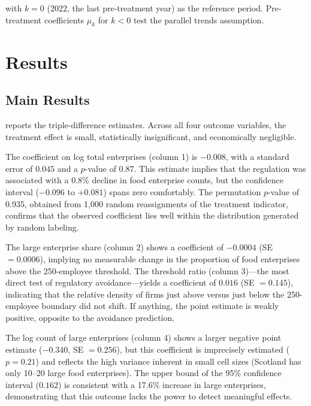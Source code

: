 \documentclass[12pt]{article}
\begin{document}
\noindent with $k = 0$ (2022, the last pre-treatment year) as the reference period. Pre-treatment coefficients $\mu_k$ for $k < 0$ test the parallel trends assumption.


\section{Results}
\label{sec:results}

\subsection{Main Results}

 reports the triple-difference estimates. Across all four outcome variables, the treatment effect is small, statistically insignificant, and economically negligible.



The coefficient on log total enterprises (column 1) is $-0.008$, with a standard error of $0.045$ and a $p$-value of $0.87$. This estimate implies that the regulation was associated with a 0.8\% decline in food enterprise counts, but the confidence interval ($-0.096$ to $+0.081$) spans zero comfortably. The permutation $p$-value of 0.935, obtained from 1,000 random reassignments of the treatment indicator, confirms that the observed coefficient lies well within the distribution generated by random labeling.

The large enterprise share (column 2) shows a coefficient of $-0.0004$ (SE $= 0.0006$), implying no measurable change in the proportion of food enterprises above the 250-employee threshold. The threshold ratio (column 3)---the most direct test of regulatory avoidance---yields a coefficient of $0.016$ (SE $= 0.145$), indicating that the relative density of firms just above versus just below the 250-employee boundary did not shift. If anything, the point estimate is weakly positive, opposite to the avoidance prediction.

The log count of large enterprises (column 4) shows a larger negative point estimate ($-0.340$, SE $= 0.256$), but this coefficient is imprecisely estimated ($p = 0.21$) and reflects the high variance inherent in small cell sizes (Scotland has only 10--20 large food enterprises). The upper bound of the 95\% confidence interval ($0.162$) is consistent with a 17.6\% increase in large enterprises, demonstrating that this outcome lacks the power to detect meaningful effects.
\end{document}
